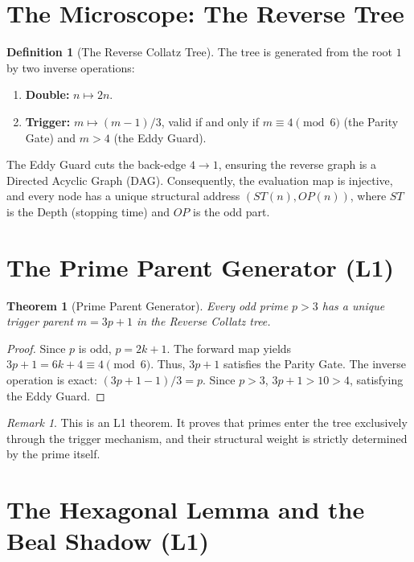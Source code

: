 \documentclass[11pt]{article}
\newtheorem{theorem}{Theorem}
\theoremstyle{definition}
\newtheorem{definition}{Definition}
\theoremstyle{remark}
\newtheorem{remark}{Remark}
\begin{document}
\section{The Microscope: The Reverse Tree}

\begin{definition}[The Reverse Collatz Tree]
The tree is generated from the root \(1\) by two inverse operations:
\begin{enumerate}
    \item \textbf{Double:} \(n \mapsto 2n\).
    \item \textbf{Trigger:} \(m \mapsto (m-1)/3\), valid if and only if \(m \equiv 4 \pmod 6\) (the Parity Gate) and \(m > 4\) (the Eddy Guard).
\end{enumerate}
\end{definition}

The Eddy Guard cuts the back-edge \(4 \to 1\), ensuring the reverse graph is a Directed Acyclic Graph (DAG). Consequently, the evaluation map is injective, and every node has a unique structural address \((ST(n), OP(n))\), where \(ST\) is the Depth (stopping time) and \(OP\) is the odd part.

\section{The Prime Parent Generator (L1)}

\begin{theorem}[Prime Parent Generator]
Every odd prime \(p > 3\) has a unique trigger parent \(m = 3p+1\) in the Reverse Collatz tree.
\end{theorem}

\begin{proof}
Since \(p\) is odd, \(p = 2k+1\). The forward map yields \(3p+1 = 6k+4 \equiv 4 \pmod 6\). Thus, \(3p+1\) satisfies the Parity Gate. The inverse operation is exact: \((3p+1-1)/3 = p\). Since \(p>3\), \(3p+1 > 10 > 4\), satisfying the Eddy Guard.
\end{proof}

\begin{remark}
This is an L1 theorem. It proves that primes enter the tree exclusively through the trigger mechanism, and their structural weight is strictly determined by the prime itself.
\end{remark}

\section{The Hexagonal Lemma and the Beal Shadow (L1)}
\end{document}
